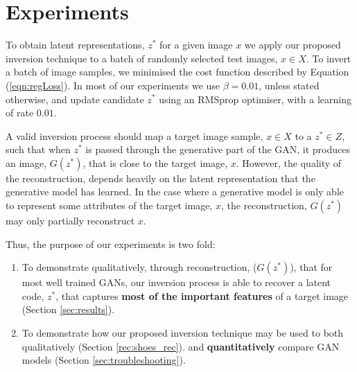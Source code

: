 \documentclass[journal]{IEEEtran}
\begin{document}

\section{Experiments}
\label{sec:experiments}
To obtain latent representations, $z^*$ for a given image $x$ we apply our proposed inversion technique to a batch of randomly selected test images, $x \in X$. To invert a batch of image samples, we minimised the cost function described by Equation (\ref{eqn:regLoss}). In most of our experiments we use $\beta=0.01$, unless stated otherwise, and update candidate $z^*$ using an RMSprop optimiser, with a learning of rate $0.01$.

A valid inversion process should map a target image sample, $x\in X$ to a $z^* \in Z$, such that when $z^*$ is passed through the generative part of the GAN, it produces an image, $G(z^*)$, that is close to the target image, $x$. However, the quality of the reconstruction, depends heavily on the latent representation that the generative model has learned. In the case where a generative model is only able to represent some attributes of the target image, $x$, the reconstruction, $G(z^*)$ may only partially reconstruct $x$.

Thus, the purpose of our experiments is two fold:
\begin{enumerate}
    \item To demonstrate qualitatively, through reconstruction, ($G(z^*)$), that for most well trained GANs, our inversion process is able to recover a latent code, $z^*$, that captures \textbf{most of the important features} of a target image (Section \ref{sec:results}).
    \item To demonstrate how our proposed inversion technique may be used to both qualitatively (Section \ref{rec:shoes_rec}). and \textbf{quantitatively} compare GAN models (Section \ref{sec:troubleshooting}).
\end{enumerate}

\end{document}
